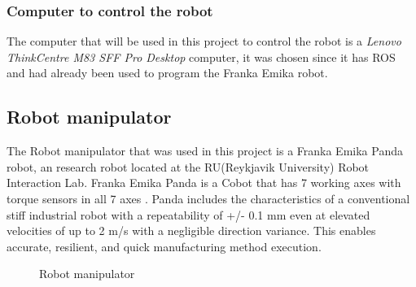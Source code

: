 \subsubsection*{Computer to control the robot}
The computer that will be used in this project to control the robot is a \textit{Lenovo ThinkCentre M83 SFF Pro Desktop}\cite{noauthor_thinkcentre_nodate} computer, it was chosen since it has ROS and had already been used to program the Franka Emika robot. 

\clearpage

\subsection{Robot manipulator\label{subsec:robot}}
The Robot manipulator that was used in this project is a Franka Emika Panda robot, an research robot located at the RU(Reykjavik University) Robot Interaction Lab. Franka Emika Panda is a Cobot that has 7 working axes with torque sensors in all 7 axes \cite{gmbh_franka_nodate}. Panda includes the characteristics of a conventional stiff industrial robot with a repeatability of +/- 0.1 mm even at elevated velocities of up to 2 m/s with a negligible direction variance. This enables accurate, resilient, and quick manufacturing method execution. 
\begin{figure}[h]
    \centering
    \hfill
    \caption{Robot manipulator}
    \label{figure: frankaemika}
\end{figure}
